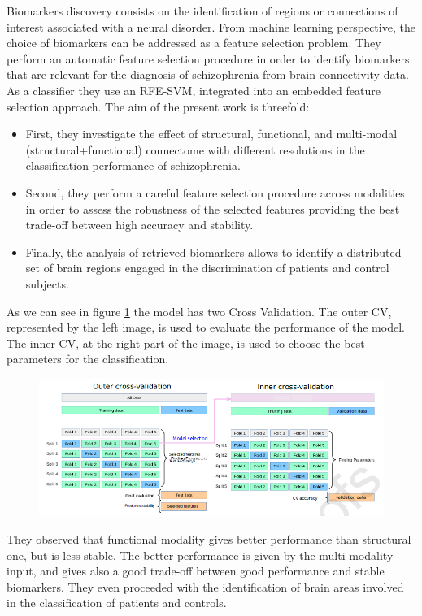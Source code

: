 Biomarkers discovery consists on the identification of regions or connections of interest associated with a neural disorder. From machine learning perspective, the choice of biomarkers can be addressed as a feature selection problem. They perform an automatic feature selection procedure in order to identify biomarkers that are relevant for the diagnosis of schizophrenia from brain connectivity data. As a classifier they use an RFE-SVM, integrated into an embedded feature selection approach. The aim of the present work is threefold:

\begin{itemize}
	\item First, they investigate the effect of structural, functional, and multi-modal (structural+functional) connectome with different resolutions in the classification performance of schizophrenia.
	\item Second, they perform a careful feature selection procedure across modalities in order to assess the robustness of the selected features providing the best trade-off between high accuracy and stability. 
	\item Finally, the analysis of retrieved biomarkers allows to identify a distributed set of brain regions engaged in the discrimination of patients and control subjects.
\end{itemize}  

As we can see in figure \ref{fig:diagram18} the model has two Cross Validation. The outer CV, represented by the left image, is used to evaluate the performance of the model. The inner CV, at the right part of the image, is used to choose the best parameters for the classification.

\begin{figure}[htbp]
	\centering
	\includegraphics[scale=0.65]{Immagini/stablebiomarkers.PNG}
	\caption{\label{fig:diagram18}}
\end{figure}

They observed that functional modality gives better performance than structural one, but is less stable. The better performance is given by the multi-modality input, and gives also a good trade-off between good performance and stable biomarkers. They even proceeded with the identification of brain areas involved in the classification of patients and controls.

